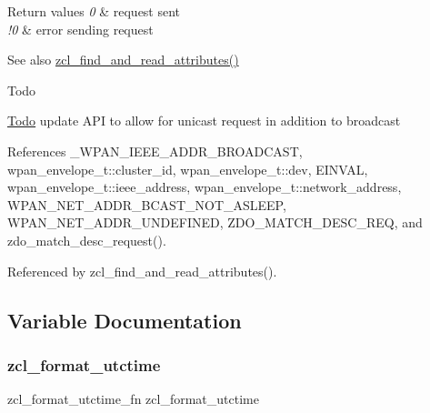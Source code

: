 \begin{DoxyRetVals}{Return values}
{\em 0} & request sent \\
\hline
{\em !0} & error sending request\\
\hline
\end{DoxyRetVals}
\begin{DoxySeeAlso}{See also}
\hyperlink{group__zcl__client_gae673efbd325cea1f3befacda58332191}{zcl\+\_\+find\+\_\+and\+\_\+read\+\_\+attributes()}
\end{DoxySeeAlso}
\begin{DoxyRefDesc}{Todo}
\item[\hyperlink{todo__todo000015}{Todo}]update A\+PI to allow for unicast request in addition to broadcast \end{DoxyRefDesc}


References \+\_\+\+W\+P\+A\+N\+\_\+\+I\+E\+E\+E\+\_\+\+A\+D\+D\+R\+\_\+\+B\+R\+O\+A\+D\+C\+A\+ST, wpan\+\_\+envelope\+\_\+t\+::cluster\+\_\+id, wpan\+\_\+envelope\+\_\+t\+::dev, E\+I\+N\+V\+AL, wpan\+\_\+envelope\+\_\+t\+::ieee\+\_\+address, wpan\+\_\+envelope\+\_\+t\+::network\+\_\+address, W\+P\+A\+N\+\_\+\+N\+E\+T\+\_\+\+A\+D\+D\+R\+\_\+\+B\+C\+A\+S\+T\+\_\+\+N\+O\+T\+\_\+\+A\+S\+L\+E\+EP, W\+P\+A\+N\+\_\+\+N\+E\+T\+\_\+\+A\+D\+D\+R\+\_\+\+U\+N\+D\+E\+F\+I\+N\+ED, Z\+D\+O\+\_\+\+M\+A\+T\+C\+H\+\_\+\+D\+E\+S\+C\+\_\+\+R\+EQ, and zdo\+\_\+match\+\_\+desc\+\_\+request().



Referenced by zcl\+\_\+find\+\_\+and\+\_\+read\+\_\+attributes().



\subsection{Variable Documentation}
\mbox{\label{group__zcl__client_gaece15f78359a3bae016be1d24e7d9ad9}} 
\subsubsection{\texorpdfstring{zcl\+\_\+format\+\_\+utctime}{zcl\_format\_utctime}\hspace{0.1cm}{\footnotesize\ttfamily [1/2]}}
{\footnotesize\ttfamily zcl\+\_\+format\+\_\+utctime\+\_\+fn zcl\+\_\+format\+\_\+utctime}



